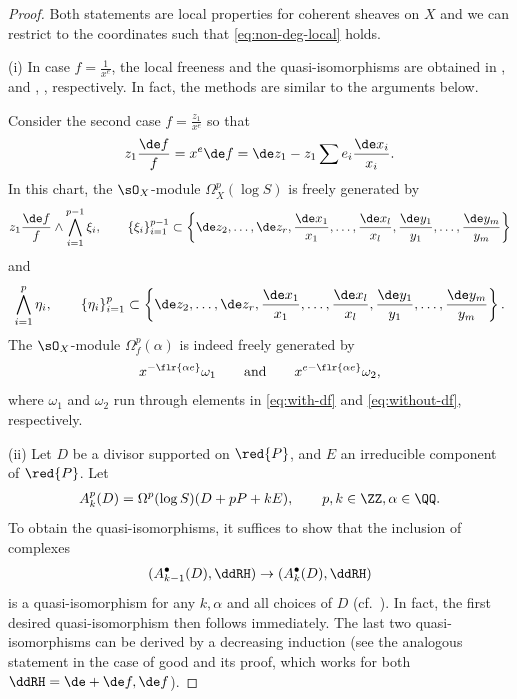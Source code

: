 \begin{proof} Both statements are local properties for coherent sheaves on $X$ and we can restrict to the coordinates such that \eqref{eq:non-deg-local} holds.

(i) In case $f = \frac{1}{x^e}$, the local freeness and the quasi-isomorphisms are obtained in \cite[equation~(1.3.1)]{ESY}, \cite[Lemma 2.12(a)]{KKP} and \cite[Proposition~1.3.]{Y}, \cite[Proposition~1.4.2]{ESY},
respectively. In fact, the methods are similar to the arguments below.

Consider the second case $f = \frac{z_1}{x^e}$ so that
\begin{gather*} z_1\frac{\de f}{f} = x^e\de f = \de z_1 - z_1\sum e_i\frac{\de x_i}{x_i}. \end{gather*}
In this chart,
the $\sO_X$-module $\Omega_X^p(\log S)$ is freely generated by
\begin{gather}\label{eq:with-df}
z_1\frac{\de f}{f}\wedge\bigwedge_{i=1}^{p-1}\xi_i, \qquad \{\xi_i \}_{i=1}^{p-1} \subset \left\{ \de z_2,\dots, \de z_r,\frac{\de x_1}{x_1},\dots, \frac{\de x_l}{x_l},\frac{\de y_1}{y_1},\dots, \frac{\de y_m}{y_m} \right\}
\end{gather}
and
\begin{gather}\label{eq:without-df}
\bigwedge_{i=1}^p\eta_i, \qquad \{\eta_i \}_{i=1}^p \subset \left\{ \de z_2,\dots, \de z_r, \frac{\de x_1}{x_1},\dots, \frac{\de x_l}{x_l},\frac{\de y_1}{y_1},\dots, \frac{\de y_m}{y_m} \right\}.
\end{gather}
The $\sO_X$-module $\Omega_f^p(\alpha)$ is indeed freely generated by
\begin{gather}\label{eq:Kont-loc-gen}
x^{-\flr{\alpha e}}\omega_1 \qquad\text{and}\qquad x^{e-\flr{\alpha e}}\omega_2,
\end{gather}
where $\omega_1$ and $\omega_2$ run through elements in \eqref{eq:with-df} and \eqref{eq:without-df}, respectively.

(ii) Let $D$ be a divisor supported on $\red{P}$, and $E$ an irreducible component of $\red{P}$. Let
\begin{gather*} A^p_k(D) = \Omega^p(\log S)(D +pP + kE), \qquad p,k\in\ZZ, \alpha\in\QQ. \end{gather*}
To obtain the quasi-isomorphisms, it suffices to show that the inclusion of complexes
\begin{gather}\label{eq:extended}
(A_{k-1}^\bullet(D), \ddRH) \to (A_k^\bullet(D), \ddRH)
\end{gather}
is a quasi-isomorphism for any $k,\alpha$ and all choices of $D$ (cf.~\cite[Proposition~1.2]{Y}). In fact, the first desired quasi-isomorphism then follows immediately. The last two quasi-isomorphisms can be derived by a decreasing induction (see the analogous statement \cite[Proposition~1.4.2]{ESY} in the case of good {\cpt} and its proof, which works for both $\ddRH = \de+\de f, \de f$).


\end{proof}

